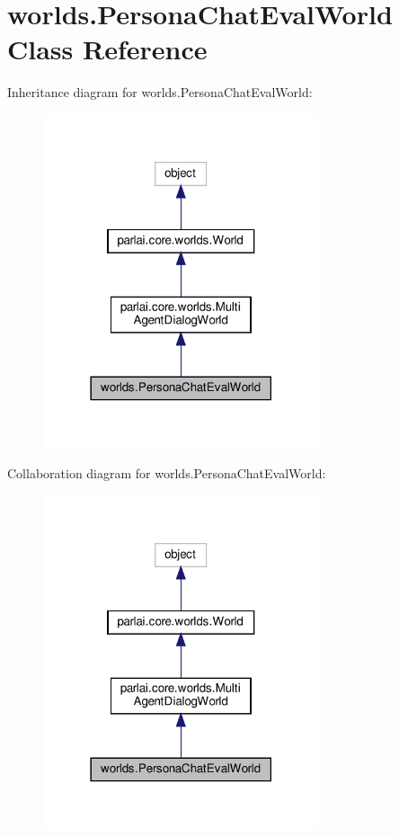 \hypertarget{classworlds_1_1PersonaChatEvalWorld}{}\section{worlds.\+Persona\+Chat\+Eval\+World Class Reference}
\label{classworlds_1_1PersonaChatEvalWorld}


Inheritance diagram for worlds.\+Persona\+Chat\+Eval\+World\+:
\nopagebreak
\begin{figure}[H]
\begin{center}
\leavevmode
\includegraphics[width=230pt]{classworlds_1_1PersonaChatEvalWorld__inherit__graph}
\end{center}
\end{figure}


Collaboration diagram for worlds.\+Persona\+Chat\+Eval\+World\+:
\nopagebreak
\begin{figure}[H]
\begin{center}
\leavevmode
\includegraphics[width=230pt]{classworlds_1_1PersonaChatEvalWorld__coll__graph}
\end{center}
\end{figure}
